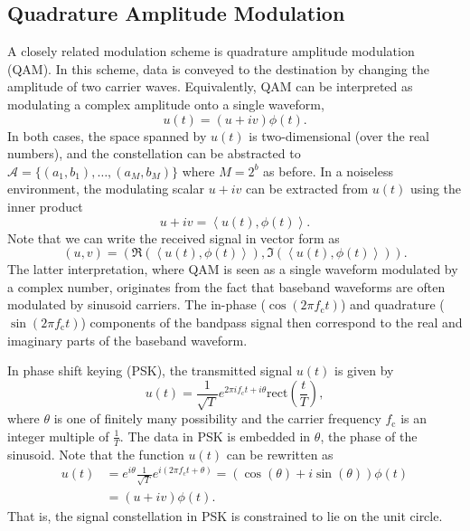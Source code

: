 \subsection{Quadrature Amplitude Modulation}

A closely related modulation scheme is quadrature amplitude modulation (QAM).
In this scheme, data is conveyed to the destination by changing the amplitude of two carrier waves.
Equivalently, QAM can be interpreted as modulating a complex amplitude onto a single waveform,
\begin{equation*}
u(t) = (u + iv) \phi(t) .
\end{equation*}
In both cases, the space spanned by $u(t)$ is two-dimensional (over the real numbers), and the constellation can be abstracted to $\mathcal{A} = \{ (a_1, b_1), \ldots, (a_M, b_M) \}$ where $M = 2^b$ as before.
In a noiseless environment, the modulating scalar $u + iv$ can be extracted from $u(t)$ using the inner product
\begin{equation*}
u + i v = \left\langle u(t), \phi(t) \right\rangle .
\end{equation*}
Note that we can write the received signal in vector form as
\begin{equation*}
(u, v) = \left( \Re \left( \left\langle u(t), \phi(t) \right\rangle \right),
\Im \left( \left\langle u(t), \phi(t) \right\rangle \right) \right) .
\end{equation*}
The latter interpretation, where QAM is seen as a single waveform modulated by a complex number, originates from the fact that baseband waveforms are often modulated by sinusoid carriers.
The in-phase ($\cos (2 \pi f_{\mathrm{c}} t)$) and quadrature ($\sin (2 \pi f_{\mathrm{c}} t)$) components of the bandpass signal then correspond to the real and imaginary parts of the baseband waveform.

\begin{example}
In phase shift keying (PSK), the transmitted signal $u(t)$ is given by
\begin{equation*}
u(t) = \frac{1}{\sqrt{T}} e^{2 \pi i f_{\mathrm{c}} t + i \theta}
\mathrm{rect} \left( \frac{t}{T} \right) ,
\end{equation*}
where $\theta$ is one of finitely many possibility and the carrier frequency $f_{\mathrm{c}}$ is an integer multiple of $\frac{1}{T}$.
The data in PSK is embedded in $\theta$, the phase of the sinusoid.
Note that the function $u(t)$ can be rewritten as
\begin{equation*}
\begin{split}
u(t) &= e^{i \theta} \frac{1}{\sqrt{T}} e^{i (2 \pi f_{\mathrm{c}} t + \theta)}
= \left( \cos (\theta) + i \sin (\theta) \right) \phi (t) \\
&= (u + iv) \phi (t) .
\end{split}
\end{equation*}
That is, the signal constellation in PSK is constrained to lie on the unit circle.
\end{example}



